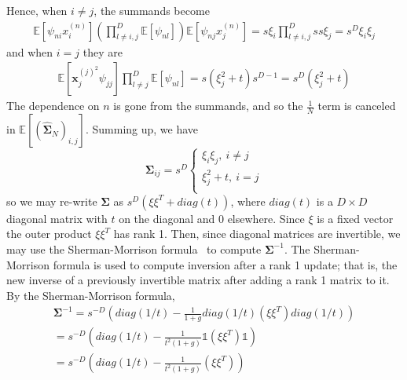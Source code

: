         Hence, when $i\neq j$, the summands become
        \begin{align*}
            \mathds{E}[\psi_{ni}x^{(n)}_i] (\prod_{l\neq i,j}^D \mathds{E}[\psi_{nl}]) \mathds{E}[\psi_{nj}x^{(n)}_j] = s\xi_i \prod_{l\neq i,j}^D s s\xi_j = s^D \xi_i \xi_j
        \end{align*}
        and when $i=j$ they are
        \begin{align*}
            \mathds{E}[\mathbf{x}^{{(j)}^2}_j \psi_{jj}] \prod_{l\neq j}^D \mathds{E}[\psi_{nl}] = s(\xi_j^2 + t)s^{D-1} = s^D (\xi_j^2 + t)
        \end{align*}
        The dependence on $n$ is gone from the summands, and so the $\frac{1}{N}$ term is canceled in $\mathds{E}[(\hat{\mathbf{\Sigma}}_N)_{i,j}]$. Summing up, we have
            $$
            \mathbf{\Sigma}_{ij} =
            s^D\begin{cases}
            \xi_i \xi_j ,\ i \neq j\\
           \xi_j^2 + t,\ i = j\\
            \end{cases}
            $$
            so we may re-write $\mathbf{\Sigma}$ as $s^D(\xi \xi^T + diag(t))$, where $diag(t)$ is a $D\times D$ diagonal matrix with $t$ on the diagonal and $0$ elsewhere. 
           Since $\xi$ is a fixed vector the outer product $\xi \xi^T$ has rank 1. Then, since diagonal matrices are invertible, we may use the Sherman-Morrison formula~\citep{sherman50adjustment} to compute $\mathbf{\Sigma}^{-1}$. The Sherman-Morrison formula is used to compute inversion after a rank 1 update; that is, the new inverse of a previously invertible matrix after adding a rank 1 matrix to it. By the Sherman-Morrison formula,
           \begin{gather*}
           \mathbf{\Sigma}^{-1}=s^{-D}\left(diag(1/t)-\frac{1}{1+g}diag(1/t)(\xi \xi^T)diag(1/t)\right) \\
           = s^{-D}\left(diag(1/t)-\frac{1}{t^2(1+g)}\mathds{1}(\xi \xi^T)\mathds{1}\right) \\
           = s^{-D}\left(diag(1/t)-\frac{1}{t^2(1+g)}(\xi \xi^T)\right) \\
           \end{gather*}
